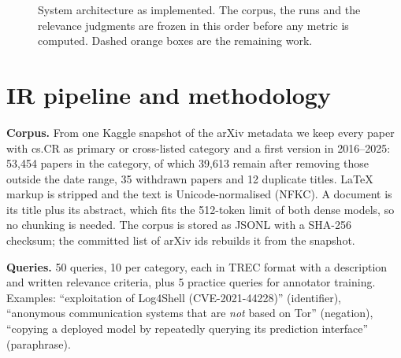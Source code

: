\documentclass[10pt,a4paper]{article}
\newcommand{\sect}[1]{\vspace{2pt}\section{#1}\vspace{-2pt}}
\begin{document}
\begin{figure}[H]
\caption{System architecture as implemented. The corpus, the runs and the relevance judgments are frozen in
this order before any metric is computed. Dashed orange boxes are the remaining work.}\label{fig:arch}
\end{figure}

\sect{IR pipeline and methodology}
\textbf{Corpus.} From one Kaggle snapshot of the arXiv metadata we keep every paper with cs.CR as primary or
cross-listed category and a first version in 2016--2025: 53{,}454 papers in the category, of which 39{,}613
remain after removing those outside the date range, 35 withdrawn papers and 12 duplicate titles. LaTeX markup
is stripped and the text is Unicode-normalised (NFKC). A document is its title plus its abstract, which fits the
512-token limit of both dense models, so no chunking is needed. The corpus is stored as JSONL with a SHA-256
checksum; the committed list of arXiv ids rebuilds it from the snapshot.

\textbf{Queries.} 50 queries, 10 per category, each in TREC format with a description and written relevance
criteria, plus 5 practice queries for annotator training. Examples: ``exploitation of Log4Shell
(CVE-2021-44228)'' (identifier), ``anonymous communication systems that are \emph{not} based on Tor''
(negation), ``copying a deployed model by repeatedly querying its prediction interface'' (paraphrase).
\end{document}
